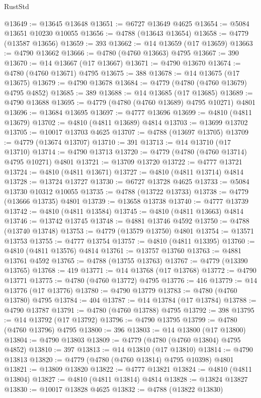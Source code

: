\begin{lexlean}{RustStd}
\begin{coremodule}
@13649 := @13645 @13648
@13651 := @6727 @13649 @4625
@13654 := @5084 @13651 @10230 @10055
@13656 := @4788 (@13643 @13654)
@13658 := @4779 (@13587 @13656)
@13659 := 393
@13662 := @14 @13659 (@17 @13659)
@13663 := @4790 @13662
@13666 := @4780 (@4760 @13663) @4795
@13667 := 390
@13670 := @14 @13667 (@17 @13667)
@13671 := @4790 @13670
@13674 := @4780 (@4760 @13671) @4795
@13675 := 388
@13678 := @14 @13675 (@17 @13675)
@13679 := @4790 @13678
@13684 := @4779 (@4780 (@4760 @13679) @4795 @4852)
@13685 := 389
@13688 := @14 @13685 (@17 @13685)
@13689 := @4790 @13688
@13695 := @4779 (@4780 (@4760 @13689) @4795 @10271) @4801
@13696 := @13684 @13695
@13697 := @4777 @13696
@13699 := @4810 (@4811 @13679)
@13702 := @4810 (@4811 @13689) @4814
@13703 := @13699 @13702
@13705 := @10017 @13703 @4625
@13707 := @4788 (@13697 @13705)
@13709 := @4779 (@13674 @13707)
@13710 := 391
@13713 := @14 @13710 (@17 @13710)
@13714 := @4790 @13713
@13720 := @4779 (@4780 (@4760 @13714) @4795 @10271) @4801
@13721 := @13709 @13720
@13722 := @4777 @13721
@13724 := @4810 (@4811 @13671)
@13727 := @4810 (@4811 @13714) @4814
@13728 := @13724 @13727
@13730 := @6727 @13728 @4625
@13733 := @5084 @13730 @10312 @10055
@13735 := @4788 (@13722 @13733)
@13738 := @4779 (@13666 @13735) @4801
@13739 := @13658 @13738
@13740 := @4777 @13739
@13742 := @4810 (@4811 @13584)
@13745 := @4810 (@4811 @13663) @4814
@13746 := @13742 @13745
@13748 := @4881 @13746 @4592
@13750 := @4788 (@13740 @13748)
@13753 := @4779 (@13579 @13750) @4801
@13754 := @13571 @13753
@13755 := @4777 @13754
@13757 := @4810 (@4811 @13395)
@13760 := @4810 (@4811 @13576) @4814
@13761 := @13757 @13760
@13763 := @4881 @13761 @4592
@13765 := @4788 (@13755 @13763)
@13767 := @4779 (@13390 @13765)
@13768 := 419
@13771 := @14 @13768 (@17 @13768)
@13772 := @4790 @13771
@13775 := @4780 (@4760 @13772) @4795
@13776 := 416
@13779 := @14 @13776 (@17 @13776)
@13780 := @4790 @13779
@13783 := @4780 (@4760 @13780) @4795
@13784 := 404
@13787 := @14 @13784 (@17 @13784)
@13788 := @4790 @13787
@13791 := @4780 (@4760 @13788) @4795
@13792 := 398
@13795 := @14 @13792 (@17 @13792)
@13796 := @4790 @13795
@13799 := @4780 (@4760 @13796) @4795
@13800 := 396
@13803 := @14 @13800 (@17 @13800)
@13804 := @4790 @13803
@13809 := @4779 (@4780 (@4760 @13804) @4795 @4852)
@13810 := 397
@13813 := @14 @13810 (@17 @13810)
@13814 := @4790 @13813
@13820 := @4779 (@4780 (@4760 @13814) @4795 @10398) @4801
@13821 := @13809 @13820
@13822 := @4777 @13821
@13824 := @4810 (@4811 @13804)
@13827 := @4810 (@4811 @13814) @4814
@13828 := @13824 @13827
@13830 := @10017 @13828 @4625
@13832 := @4788 (@13822 @13830)

\end{coremodule}
\end{lexlean}
